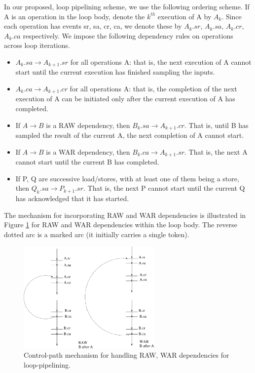 \documentclass[conference]{IEEEtran}
\begin{document}
In our proposed, loop pipelining scheme, we use the
following ordering scheme.
If A is an operation in the loop body,
denote the
$k^{th}$ execution of A by $A_k$.  Since each operation
has  events sr, sa, cr, ca, we denote these by
$A_k.sr$, $A_k.sa$, $A_k.cr$, $A_k.ca$ respectively. We impose 
the following dependency rules on operations across
loop iterations.
\begin{itemize}
\item $A_k.sa \rightarrow A_{k+1}.sr$ for all operations A: that is,
the next execution of A cannot start until the current execution has
finished sampling the inputs.
\item $A_k.ca \rightarrow A_{k+1}.cr$ for all operations A: that is,
the completion of the next execution of A can be initiated only
after the current execution of A has completed.
\item If $A \rightarrow B$ is a RAW dependency, then 
$B_k.sa \rightarrow A_{k+1}.cr$.  That is, until B has
sampled the result of the current A, the next completion
of A cannot start.
\item If $A \rightarrow B$ is a WAR dependency, then
$B_k.ca \rightarrow A_{k+1}.sr$.  That is, the next
A cannot start until the current B has completed.
\item If P, Q are successive load/stores, with at least
one of them being a store, then 
$Q_k.sa \rightarrow P_{k+1}.sr$.  That is, the next P
cannot start until the current Q has acknowledged that it
has started.
\end{itemize}
The mechanism for incorporating RAW and WAR dependencies is
illustrated in Figure \ref{fig:pipelineMechanism}
for RAW and WAR dependencies within the loop body.
The reverse dotted arc is a marked arc (it initially
carries a single token).
\begin{figure}[ht]
  \centering
  \includegraphics[width=7cm]{pipelineMechanism.eps}
  \caption{Control-path mechanism for handling RAW, WAR dependencies for loop-pipelining.}
  \label{fig:pipelineMechanism}
\end{figure}
\end{document}
